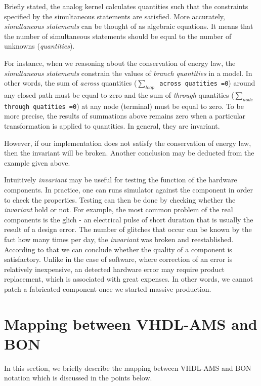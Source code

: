 \documentclass{article}
\newcommand{\inv}{\emph{invariant}\xspace}
\newcommand{\arcoss}{\emph{across}\xspace}
\newcommand{\through}{\emph{through}\xspace}
\begin{document}
Briefly stated, the analog kernel calculates quantities such that the
constraints specified by the simultaneous statements are satisfied.
More accurately, \emph{simultaneous statements} can be thought of as
algebraic equations.  It means that the number of simultaneous
statements should be equal to the number of unknowns
(\emph{quantities}).  

For instance, when we reasoning about the conservation of energy law,
the \emph{simultaneous statements} constrain the values of
\emph{branch quantities} in a model.  In other words, the sum of
\arcoss quantities (\texttt{$\sum_{loop}$ across quatities =0}) around
any closed path must be equal to zero and the sum of \through
quantities (\texttt{$\sum_{node}$ through quatities =0}) at any node
(terminal) must be equal to zero.  To be more precise, the results of
summations above remains zero when a particular transformation is
applied to quantities.  In general, they are invariant.

However, if our implementation does not satisfy the conservation of
energy law, then the invariant will be broken.  Another conclusion may
be deducted from the example given above.

Intuitively \inv may be useful for testing the function of the
hardware components.  In practice, one can runs simulator against the
component in order to check the properties. Testing can then be done
by checking whether the \inv hold or not.  For example, the most
common problem of the real components is the glich - an electrical
pulse of short duration that is usually the result of a design error.
The number of glitches that occur can be known by the fact how many
times per day, the \inv was broken and reestablished. According to
that we can conclude whether the quality of a component is
satisfactory. Unlike in the case of software, where correction of an
error is relatively inexpensive, an detected hardware error may
require product replacement, which is associated with great expenses.
In other words, we cannot patch a fabricated component once we started
massive production.

\section{Mapping between VHDL-AMS and BON}
\label{sec:mappingVB} 

In this section, we briefly describe the mapping between VHDL-AMS and
BON notation which is discussed in the points below.
\end{document}
